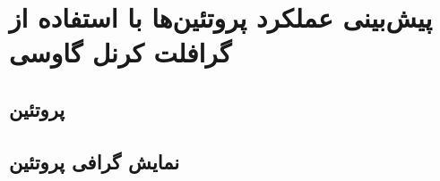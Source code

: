 \chapter{پیش‌بینی عملکرد پروتئین‌ها با استفاده از گرافلت کرنل گاوسی}
\section{پروتئین}
\section{نمایش گرافی پروتئین}

